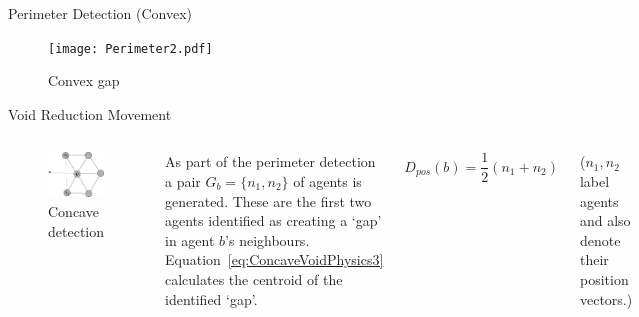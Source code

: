 \documentclass{beamer}
\begin{document}
\begin{frame}{Perimeter Detection (Convex)}
  \begin{figure}
    \begin{center}
      \texttt{[image: Perimeter2.pdf]}
    \end{center}
    \caption{Convex gap}
  \end{figure}
\end{frame}

\begin{frame}{Void Reduction Movement}
  \begin{columns}
    \begin{figure}
      \begin{center}
        \includegraphics[width=5cm]{VoidConcave1.pdf}
      \end{center}
      \caption{Concave detection}
    \end{figure}
    As part of the perimeter detection a pair $G_b = \{n_1, n_2\}$ of agents is generated. These are the first two agents identified as creating a `gap' in agent $b$'s neighbours. Equation~\ref{eq:ConcaveVoidPhysics3} calculates the centroid of the identified `gap'.
    \begin{center}
      \begin{equation}
      D_{pos}(b)=\frac{1}{2} (n_1 + n_2) %
      \label{eq:ConcaveVoidPhysics3}
      \end{equation}
    \end{center}
    ($n_1, n_2$ label agents and also denote their position vectors.)
  \end{columns}
\end{frame}
\end{document}
